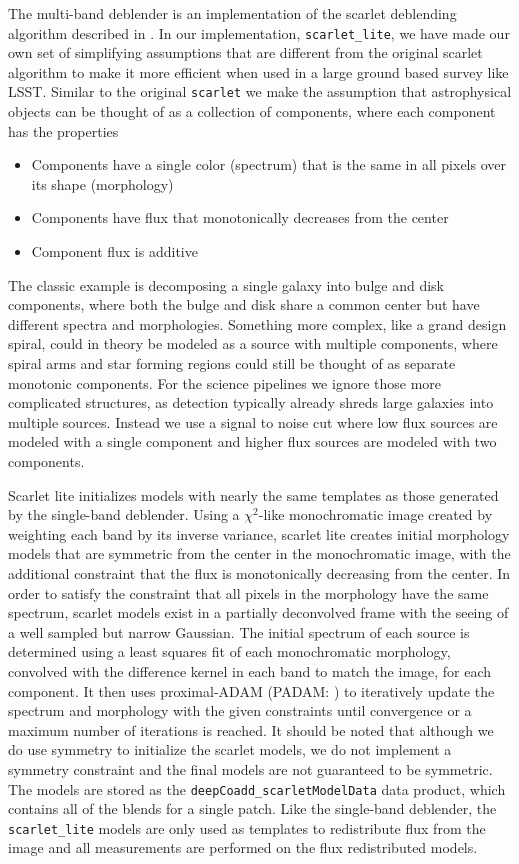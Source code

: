 The multi-band deblender is an implementation of the scarlet deblending algorithm described in \cite{2018ascl.soft03003M}.
In our implementation, \texttt{scarlet\_lite}, we have made our own set of simplifying assumptions that are different from the original scarlet algorithm to make it more efficient when used in a large ground based survey like LSST.
Similar to the original \texttt{scarlet} we make the assumption that astrophysical objects can be thought of as a collection of components, where each component has the properties
\begin{itemize}
    \item Components have a single color (spectrum) that is the same in all pixels over its shape (morphology)
    \item Components have flux that monotonically decreases from the center
    \item Component flux is additive
\end{itemize}

The classic example is decomposing a single galaxy into bulge and disk components, where both the bulge and disk share a common center but have different spectra and morphologies.
Something more complex, like a grand design spiral, could in theory be modeled as a source with multiple components, where spiral arms and star forming regions could still be thought of as separate monotonic components.
For the science pipelines we ignore those more complicated structures, as detection typically already shreds large galaxies into multiple sources.
Instead we use a signal to noise cut where low flux sources are modeled with a single component and higher flux sources are modeled with two components.

Scarlet lite initializes models with nearly the same templates as those generated by the single-band deblender.
Using a $\chi^2$-like monochromatic image created by weighting each band by its inverse variance, scarlet lite creates initial morphology models that are symmetric from the center in the monochromatic image, with the additional constraint that the flux is monotonically decreasing from the center.
In order to satisfy the constraint that all pixels in the morphology have the same spectrum, scarlet models exist in a partially deconvolved frame with the seeing of a well sampled but narrow Gaussian.
The initial spectrum of each source is determined using a least squares fit of each monochromatic morphology, convolved with the difference kernel in each band to match the image, for each component.
It then uses proximal-ADAM (PADAM: \cite{Melchior2019}) to iteratively update the spectrum and morphology with the given constraints until convergence or a maximum number of iterations is reached.
It should be noted that although we do use symmetry to initialize the scarlet models, we do not implement a symmetry constraint and the final models are not guaranteed to be symmetric.
The models are stored as the \texttt{deepCoadd\_scarletModelData} data product, which contains all of the blends for a single patch.
Like the single-band deblender, the \texttt{scarlet\_lite} models are only used as templates to redistribute flux from the image and all measurements are performed on the flux redistributed models.
